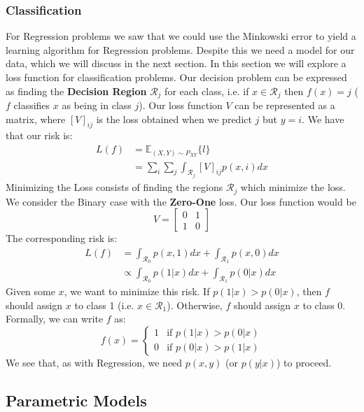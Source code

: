 \documentclass[]{article}
\theoremstyle{mattstyle}
\theoremstyle{definition}
\begin{document}
\subsubsection{Classification}

For Regression problems we saw that we could use the Minkowski error to yield a learning algorithm for Regression problems. Despite this we need a model for our data, which we will discuss in the next section. In this section we will explore a loss function for classification problems. Our decision problem can be expressed as finding the \textbf{Decision Region} $\mathcal{R}_j$ for each class, i.e. if $x \in \mathcal{R}_j$ then $f(x)=j$ ($f$ classifies $x$ as being in class $j$).
Our loss function $V$ can be represented as a matrix, where $[V]_{ij}$ is the loss obtained when we predict $j$ but $y=i$. We have that our risk is:
\begin{align*}
L(f) &= \mathbb{E}_{(X,Y)\sim P_{XY}}\{l\}\\
&= \sum_i \sum_j \int_{\mathcal{R}_j} [V]_{ij} p(x, i) dx
\end{align*}
Minimizing the Loss consists of finding the regions $\mathcal{R}_j$ which minimize the loss.
We consider the Binary case with the \textbf{Zero-One} loss. Our loss function would be $$V = \begin{bmatrix}
0 & 1 \\
1 & 0
\end{bmatrix}$$
The corresponding risk is:
\begin{align*}
L(f)&=\int_{\mathcal{R}_0}p(x, 1) dx + \int_{\mathcal{R}_1}p(x, 0) dx\\
&\propto \int_{\mathcal{R}_0}p(1|x) dx + \int_{\mathcal{R}_1}p(0|x) dx
\end{align*}
Given some $x$, we want to minimize this risk. If $p(1|x) > p(0|x)$, then $f$ should assign $x$ to class 1 (i.e. $x \in \mathcal{R}_1$). Otherwise, $f$ should assign $x$ to class 0. Formally, we can write $f$ as:
$$f(x) = \begin{cases}
1 & \text{if } p(1|x) > p(0|x)\\
0 & \text{if } p(0|x) > p(1|x)
\end{cases}$$
We see that, as with Regression, we need $p(x,y)$ (or $p(y|x)$) to proceed.

\newpage

\subsection{Parametric Models}
\end{document}
